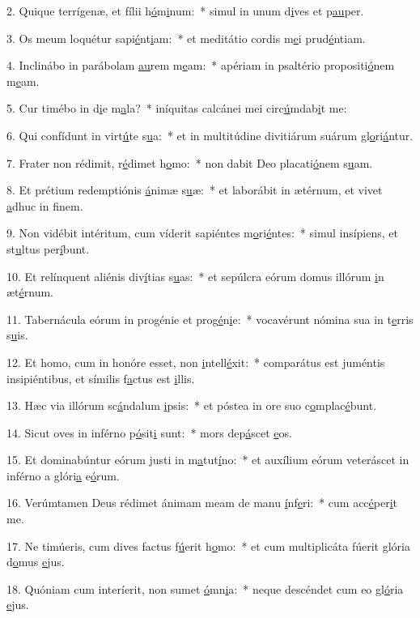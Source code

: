 2. Quique terrígenæ, et fílii h\uline{ó}m\uline{i}num:~* simul in unum d\uline{i}ves et p\uline{au}per.\par 
3. Os meum loquétur sapi\uline{é}nt\uline{i}am:~* et meditátio cordis m\uline{e}i prud\uline{é}ntiam.\par 
4. Inclinábo in parábolam \uline{au}rem m\uline{e}am:~* apériam in psaltério propositi\uline{ó}nem m\uline{e}am.\par 
5. Cur timébo in d\uline{i}e m\uline{a}la?~* iníquitas calcánei mei circ\uline{ú}mdab\uline{i}t me:\par 
6. Qui confídunt in virt\uline{ú}te s\uline{u}a:~* et in multitúdine divitiárum suárum gl\uline{o}ri\uline{á}ntur.\par 
7. Frater non rédimit, r\uline{é}dimet h\uline{o}mo:~* non dabit Deo placati\uline{ó}nem s\uline{u}am.\par 
8. Et prétium redemptiónis \uline{á}nimæ s\uline{u}æ:~* et laborábit in ætérnum, et vivet \uline{a}dhuc in f\uline{i}nem.\par 
9. Non vidébit intéritum, cum víderit sapiéntes m\uline{o}ri\uline{é}ntes:~* simul insípiens, et st\uline{u}ltus per\uline{í}bunt.\par 
10. Et relínquent aliénis div\uline{í}tias s\uline{u}as:~* et sepúlcra eórum domus illórum \uline{i}n æt\uline{é}rnum.\par 
11. Tabernácula eórum in progénie et prog\uline{é}n\uline{i}e:~* vocavérunt nómina sua in t\uline{e}rris s\uline{u}is.\par 
12. Et homo, cum in honóre esset, non \uline{i}ntell\uline{é}xit:~* comparátus est juméntis insipiéntibus, et símilis f\uline{a}ctus est \uline{i}llis.\par 
13. Hæc via illórum sc\uline{á}ndalum \uline{i}psis:~* et póstea in ore suo c\uline{o}mplac\uline{é}bunt.\par 
14. Sicut oves in inférno p\uline{ó}sit\uline{i} sunt:~* mors dep\uline{á}scet \uline{e}os.\par 
15. Et dominabúntur eórum justi in m\uline{a}tut\uline{í}no:~* et auxílium eórum veteráscet in inférno a glóri\uline{a} e\uline{ó}rum.\par 
16. Verúmtamen Deus rédimet ánimam meam de manu \uline{í}nf\uline{e}ri:~* cum acc\uline{é}per\uline{i}t me.\par 
17. Ne timúeris, cum dives factus f\uline{ú}erit h\uline{o}mo:~* et cum multiplicáta fúerit glória d\uline{o}mus \uline{e}jus.\par 
18. Quóniam cum interíerit, non sumet \uline{ó}mn\uline{i}a:~* neque descéndet cum eo gl\uline{ó}ria \uline{e}jus.\par 
